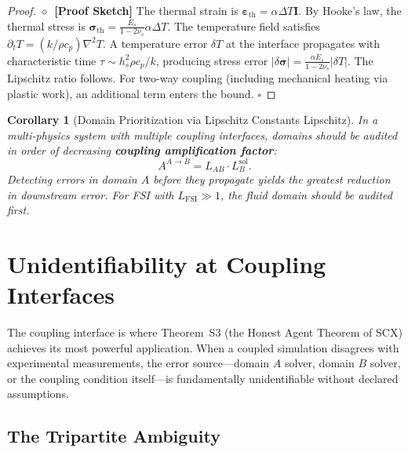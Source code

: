 \documentclass[11pt,a4paper]{article}
\newtheorem{corollary}[theorem]{Corollary}
\theoremstyle{definition}
\newcommand{\rigorSketch}[0]{$\diamond$~\textbf{[Proof Sketch]}}
\newcommand{\SCX}{\textsc{SCX}}
\newcommand{\ThmSCXHonest}{Theorem~S3}
\begin{document}
\begin{proof}\rigorSketch
The thermal strain is $\boldsymbol{\varepsilon}_{\mathrm{th}} = \alpha \Delta T \mathbf{I}$. By Hooke's law, the thermal stress is $\boldsymbol{\sigma}_{\mathrm{th}} = \frac{E_s}{1-2\nu_s} \alpha \Delta T$. The temperature field satisfies $\partial_t T = (k/\rho c_p) \nabla^2 T$. A temperature error $\delta T$ at the interface propagates with characteristic time $\tau \sim h_s^2 \rho c_p / k$, producing stress error $|\delta \boldsymbol{\sigma}| = \frac{\alpha E_s}{1-2\nu_s} |\delta T|$. The Lipschitz ratio follows. For two-way coupling (including mechanical heating via plastic work), an additional term enters the bound. $\square$
\end{proof}

\begin{corollary}[Domain Prioritization via Lipschitz Constants Lipschitz]\label{cor:domain_priority}
In a multi-physics system with multiple coupling interfaces, domains should be audited in order of decreasing \textbf{coupling amplification factor}:
\begin{equation}\label{eq:amplification}
A^{A \to B} = L_{AB} \cdot L_B^{\mathrm{sol}}.
\end{equation}
Detecting errors in domain $A$ before they propagate yields the greatest reduction in downstream error. For FSI with $L_{\mathrm{FSI}} \gg 1$, the fluid domain should be audited first.
\end{corollary}

\section{Unidentifiability at Coupling Interfaces }
\label{sec:unidentifiability}

The coupling interface is where \ThmSCXHonest{} (the Honest Agent Theorem of \SCX) achieves its most powerful application. When a coupled simulation disagrees with experimental measurements, the error source---domain $A$ solver, domain $B$ solver, or the coupling condition itself---is fundamentally unidentifiable without declared assumptions.

\subsection{The Tripartite Ambiguity }
\end{document}
